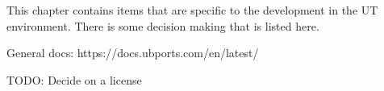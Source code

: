 This chapter contains items that are specific to the development in the UT environment. There is some decision making that is listed here.


General docs:
https://docs.ubports.com/en/latest/


TODO: Decide on a license



